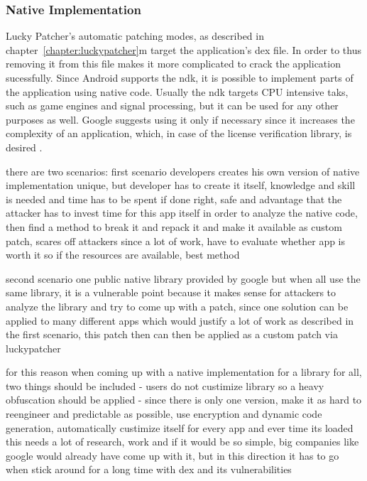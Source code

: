 \subsubsection{Native Implementation} \label{subsection:counter-modifications-dynamic}

Lucky Patcher's automatic patching modes, as described in chapter~\ref{chapter:luckypatcher}m target the application's \gls{dex} file.
In order to  thus removing it from this file makes it more complicated to crack the application sucessfully.
Since Android supports the \gls{ndk}, it is possible to implement parts of the application using native code.
Usually the \gls{ndk} targets CPU intensive taks, such as game engines and signal processing, but it can be used for any other purposes as well.
Google suggests using it only if necessary since it increases the complexity of an application, which, in case of the license verification library, is desired \cite{androidNdk}.



there are two scenarios:
first scenario
developers creates his own version of native implementation
unique, but developer has to create it itself, knowledge and skill is needed and time has to be spent
if done right, safe and advantage that the attacker has to invest time for this app itself in order to analyze the native code, then find a method to break it and repack it and make it available as custom patch, scares off attackers since a lot of work, have to evaluate whether app is worth it
so if the resources are available, best method

second scenario
one public native library provided by google
but when all use the same library, it is a vulnerable point because it makes sense for attackers to analyze the library and try to come up with a patch, since one solution can be applied to many different apps which would justify a lot of work as described in the first scenario, this patch then can then be applied as a custom patch via luckypatcher

for this reason when coming up with a native implementation for a library for all, two things should be included
- users do not custimize library so a heavy obfuscation should be applied
- since there is only one version, make it as hard to reengineer and predictable as possible, use encryption and dynamic code generation, automatically custimize itself for every app and ever time its loaded
this needs a lot of research, work and if it would be so simple, big companies like google would already have come up with it, but in this direction it has to go when stick around for a long time with dex and its vulnerabilities


